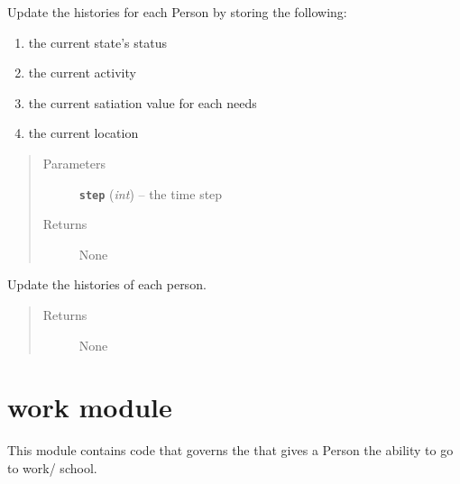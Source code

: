 \documentclass[letterpaper,10pt,english]{sphinxmanual}
\begin{document}
\begin{fulllineitems}

\begin{fulllineitems}
\label{universe:universe.Universe.update_history}
Update the histories for each Person by storing the following:
\begin{enumerate}
\item {} 
the current state's status

\item {} 
the current activity

\item {} 
the current satiation value for each needs

\item {} 
the current location

\end{enumerate}
\begin{quote}\begin{description}
\item[{Parameters}] \leavevmode
\textbf{\texttt{step}} (\emph{int}) -- the time step

\item[{Returns}] \leavevmode
None

\end{description}\end{quote}

\end{fulllineitems}


\begin{fulllineitems}
\label{universe:universe.Universe.update_history_new}
Update the histories of each person.
\begin{quote}\begin{description}
\item[{Returns}] \leavevmode
None

\end{description}\end{quote}

\end{fulllineitems}


\end{fulllineitems}



\section{work module}
\label{work::doc}\label{work:module-work}\label{work:work-module}
This module contains code that governs the {\hyperref[activity:activity.Activity]{\emph{}}} that gives a Person the ability to go to work/ school.
\end{document}
